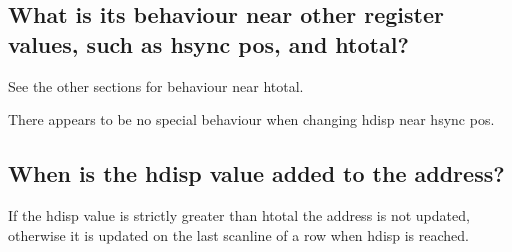 \documentclass[a4paper,10pt]{amsart}
\begin{document}
\subsection{What is its behaviour near other register values, such as hsync pos,
and htotal?}

See the other sections for behaviour near htotal.

There appears to be no special behaviour when changing hdisp near hsync pos.

\subsection{When is the hdisp value added to the address?}

If the hdisp value is strictly greater than htotal the address is not updated,
otherwise it is updated on the last scanline of a row when hdisp is reached.
\end{document}
